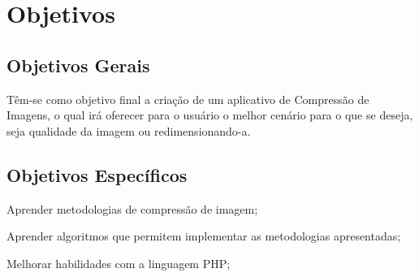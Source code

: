 \chapter{Objetivos}
\label{c.objetivos}

\section{Objetivos Gerais}
\label{s.objetivosgerais}

Têm-se como objetivo final a criação de um aplicativo de Compressão de Imagens, o qual irá oferecer para o usuário o melhor cenário para o que se deseja, seja qualidade da imagem ou redimensionando-a.

\section{Objetivos Específicos}
\label{s.objetivosespecificos}

\begin{alineas}
	\item Aprender metodologias de compressão de imagem;
	\item Aprender algoritmos que permitem implementar as metodologias apresentadas;
	\item Melhorar habilidades com a linguagem PHP;
\end{alineas}
